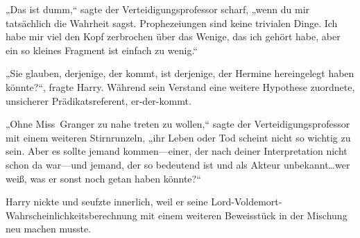 „Das ist dumm,“ sagte der Verteidigungsprofessor scharf, „wenn du mir tatsächlich die Wahrheit sagst. Prophezeiungen sind keine trivialen Dinge. Ich habe mir viel den Kopf zerbrochen über das Wenige, das ich gehört habe, aber ein so kleines Fragment ist einfach zu wenig.“

„Sie glauben, derjenige, der kommt, ist derjenige, der Hermine hereingelegt haben könnte?“, fragte Harry. Während sein Verstand eine weitere Hypothese zuordnete, unsicherer Prädikatsreferent, er-der-kommt.

„Ohne Miss~Granger zu nahe treten zu wollen,“ sagte der Verteidigungsprofessor mit einem weiteren Stirnrunzeln, „ihr Leben oder Tod scheint nicht so wichtig zu sein. Aber es sollte jemand kommen—einer, der nach deiner Interpretation nicht schon da war—und jemand, der so bedeutend ist und als Akteur unbekannt…wer weiß, was er sonst noch getan haben könnte?“

Harry nickte und seufzte innerlich, weil er seine Lord-Voldemort-Wahrscheinlichkeitsberechnung mit einem weiteren Beweisstück in der Mischung neu machen musste.

